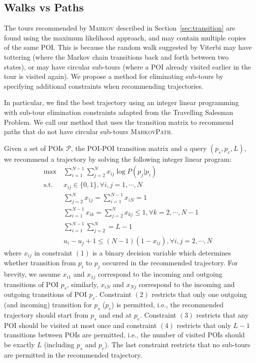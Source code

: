 \subsection{Walks vs Paths}
\label{sec:walkpath}

The tours recommended by \textsc{Markov} described in Section~\ref{sec:transition} are found
using the maximum likelihood approach, and may contain multiple copies of the same POI.
This is because the random walk suggested by Viterbi may have
tottering (where the Markov chain transitions back and forth between two states),
or may have circular sub-tours (where a POI already visited earlier in the tour is
visited again).
We propose a method for eliminating sub-tours by specifying additional constraints
when recommending trajectories.



In particular, we find the best trajectory using an integer linear programming with
sub-tour elimination constraints adapted from the Travelling Salesman Problem\cite{opt98}.
We call our method that uses the transition matrix to recommend paths
that do not have circular sub-tours \textsc{MarkovPath}.

Given a set of POIs $\mathcal{P}$, the POI-POI transition matrix and a query $(p_s, p_e, L)$,
we recommend a trajectory by solving the following integer linear program:
\begin{align}
\max ~& \sum_{i=1}^{N-1} \sum_{j=2}^N x_{ij} \log P(p_j | p_i) \nonumber \\
\text{s.t.} ~& x_{ij} \in \{0, 1\}, \forall i, j = 1, \cdots, N \\
     & \sum_{j=2}^N x_{1j} = \sum_{i=1}^{N-1} x_{iN} = 1 \\
     & \sum_{i=1}^{N-1} x_{ik} = \sum_{j=2}^N x_{kj} \le 1, \forall k=2, \cdots, N-1 \\
     & \sum_{i=1}^{N-1} \sum_{j=2}^N = L-1 \\
     & u_i - u_j + 1 \le (N-1) (1-x_{ij}), \forall i, j = 2, \cdots, N
\end{align}
where $x_{ij}$ in constraint $(1)$ is a binary decision variable which determines whether transition from $p_i$ to $p_j$
occurred in the recommended trajectory.
For brevity, we assume $x_{i1}$ and $x_{1j}$ correspond to the incoming and outgoing transitions of POI $p_s$,
similarly, $x_{iN}$ and $x_{Nj}$ correspond to the incoming and outgoing transitions of POI $p_e$.
Constraint $(2)$ restricts that only one outgoing (and incoming) transition for $p_s$ ($p_e$)
is permitted, i.e., the recommended trajectory should start from $p_s$ and end at $p_e$.
Constraint $(3)$ restricts that any POI should be visited at most once and constraint $(4)$
restricts that only $L-1$ transitions between POIs are permitted, i.e., the number of visited POIs should be
exactly $L$ (including $p_s$ and $p_e$).
The last constraint restricts that no sub-tours are permitted in the recommended trajectory.



